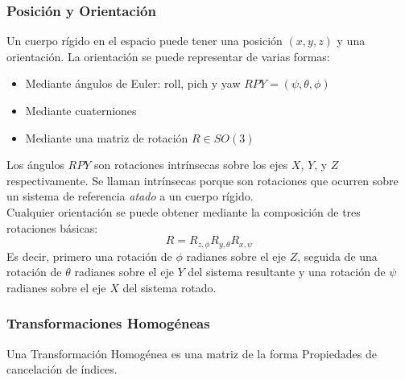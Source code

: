 
\begin{frame}\frametitle{Posición y Orientación}
  Un cuerpo rígido en el espacio puede tener una posición $(x,y,z)$ y una orientación. La orientación se puede representar de varias formas:
  \begin{itemize}
  \item Mediante ángulos de Euler: roll, pich y yaw $RPY = (\psi, \theta, \phi)$
  \item Mediante cuaterniones
  \item Mediante una matriz de rotación $R \in SO(3)$
  \end{itemize}
  Los ángulos $RPY$ son rotaciones intrínsecas sobre los ejes $X$, $Y$, y $Z$ respectivamente. Se llaman intrínsecas porque son rotaciones que ocurren sobre un sistema de referencia \textit{atado} a un cuerpo rígido.\\
  Cualquier orientación se puede obtener mediante la composición de tres rotaciones básicas:
  \[R = R_{z,\phi}R_{y,\theta}R_{x,\psi}\]
  Es decir, primero una rotación de $\phi$ radianes sobre el eje $Z$, seguida de una rotación de $\theta$ radianes sobre el eje $Y$ del sistema resultante y una rotación de $\psi$ radianes sobre el eje $X$ del sistema rotado. 
\end{frame}

\begin{frame}\frametitle{Transformaciones Homogéneas}
  Una Transformación Homogénea es una matriz de la forma
  Propiedades de cancelación de índices. 
\end{frame}
